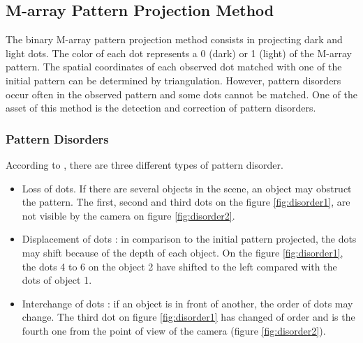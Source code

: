 \subsection{M-array Pattern Projection Method \cite{morita1988reconstruction}}

The binary M-array pattern projection method consists in projecting dark and light dots. The color of each dot represents a 0 (dark) or 1 (light) of the M-array pattern. The spatial coordinates of each observed dot matched with one of the initial pattern can be determined by triangulation. However, pattern disorders occur often in the observed pattern and some dots cannot be matched. One of the asset of this method is the detection and correction of pattern disorders.

\subsubsection{Pattern Disorders}
\label{PatternDisorders}
According to \cite{morita1988reconstruction}, there are three different types of pattern disorder.
\begin{itemize}
\item Loss of dots. If there are several objects in the scene, an object may obstruct the pattern. The first, second and third dots on the figure \ref{fig:disorder1}, are not visible by the camera on figure \ref{fig:disorder2}.
\item Displacement of dots : in comparison to the initial pattern projected, the dots may shift because of the depth of each object. On the figure \ref{fig:disorder1}, the dots 4 to 6 on the object 2 have shifted to the left compared with the dots of object 1.
\item Interchange of dots : if an object is in front of another, the order of dots may change. The third dot on figure \ref{fig:disorder1} has changed of order and is the fourth one from the point of view of the camera (figure \ref{fig:disorder2}).
\end{itemize}

